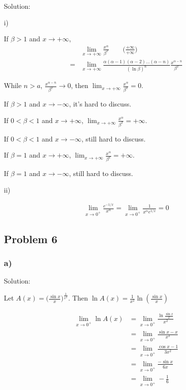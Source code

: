 \documentclass[letterpaper, 11pt]{article}
\newcommand{\1}{\mathds{1}}	%
\theoremstyle{definition}
\begin{document}
Solution:

i)

If $\beta > 1$ and $ x \to +\infty$, 
\begin{align*}
  &\lim_{x \to +\infty} \frac{x ^{\alpha}}{\beta ^{x}} \qquad\text{($\frac{+\infty}{+\infty}$)}\\
  = &\lim_{x \to +\infty}\frac{\alpha(\alpha-1)(\alpha-2)\dots(\alpha-n)}{(\ln \beta)^{n}} \frac{x ^{\alpha - n}}{\beta ^{x}}
\end{align*}

While $n > a$, $\frac{x ^{\alpha - n}}{\beta ^{x}} \to 0$, then $\lim_{x \to +\infty} \frac{x ^{\alpha}}{\beta ^{x}} = 0$.

If $\beta > 1$ and $ x \to -\infty$, it's hard to discuss.

If $0 < \beta < 1$ and $ x \to +\infty$, $\lim_{x \to +\infty} \frac{x ^{\alpha}}{\beta ^{x}} = +\infty$.

If $0 < \beta < 1$ and $ x \to -\infty$, still hard to discuss.

If $\beta = 1$ and $x \to +\infty $, $\lim_{x \to +\infty} \frac{x ^{\alpha}}{\beta ^{x}} = +\infty$.

If $\beta = 1$ and $x \to -\infty $, still hard to discuss.

ii)

\begin{align*}
  \lim_{x \to 0 ^{+}} \frac{e ^{-1/x}}{x ^{\alpha}} = \lim_{x \to 0 ^{+}} \frac{1}{x ^{\alpha}e ^{1/x}} = 0
\end{align*}


\subsection*{Problem 6}

\subsubsection*{a)}

Solution:

Let $A(x) = \big( \frac{\sin x}{x}\big)^{\frac{1}{x ^{2}}}$. Then $\ln A(x)  = \frac{1}{x ^{2}}\ln(\frac{\sin x}{x})$

\begin{align*}
  \lim_{x \to 0 ^{+}} \ln A(x) &= \lim_{x \to 0 ^{+}}  \frac{\ln \frac{\sin x}{x}}{x ^{2}} \\ 
           &= \lim_{x \to 0 ^{+}} \frac{\sin x - x}{x ^{3}} \\
           &=\lim_{x \to 0 ^{+}}  \frac{\cos x - 1}{3 x ^{2}} \\
           &= \lim_{x \to 0 ^{+}} \frac{-\sin x}{6x} \\
           &= \lim_{x \to 0 ^{+}} -\frac{1}{6}
\end{align*}
\end{document}
